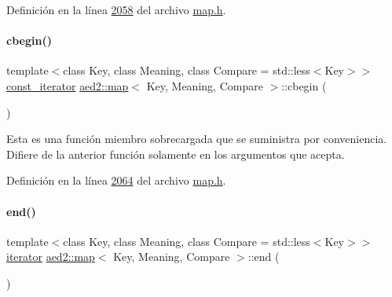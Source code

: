 Definición en la línea \hyperlink{map_8h_source_l02058}{2058} del archivo \hyperlink{map_8h_source}{map.\+h}.

\mbox{\label{classaed2_1_1map_ab96ad892caa28f193481a578f4956a2a_ab96ad892caa28f193481a578f4956a2a}} 
\paragraph{\texorpdfstring{cbegin()}{cbegin()}}
{\footnotesize\ttfamily template$<$class Key, class Meaning, class Compare = std\+::less$<$\+Key$>$$>$ \\
\hyperlink{classaed2_1_1map_1_1const__iterator}{const\+\_\+iterator} \hyperlink{classaed2_1_1map}{aed2\+::map}$<$ Key, Meaning, Compare $>$\+::cbegin (\begin{DoxyParamCaption}{ }\end{DoxyParamCaption})\hspace{0.3cm}{\ttfamily [inline]}}

Esta es una función miembro sobrecargada que se suministra por conveniencia. Difiere de la anterior función solamente en los argumentos que acepta. 

Definición en la línea \hyperlink{map_8h_source_l02064}{2064} del archivo \hyperlink{map_8h_source}{map.\+h}.

\mbox{\label{classaed2_1_1map_a76023e6a56cb625513e1b5ea028bf983_a76023e6a56cb625513e1b5ea028bf983}} 
\paragraph{\texorpdfstring{end()}{end()}\hspace{0.1cm}{\footnotesize\ttfamily [1/2]}}
{\footnotesize\ttfamily template$<$class Key, class Meaning, class Compare = std\+::less$<$\+Key$>$$>$ \\
\hyperlink{classaed2_1_1map_1_1iterator}{iterator} \hyperlink{classaed2_1_1map}{aed2\+::map}$<$ Key, Meaning, Compare $>$\+::end (\begin{DoxyParamCaption}{ }\end{DoxyParamCaption})\hspace{0.3cm}{\ttfamily [inline]}}



